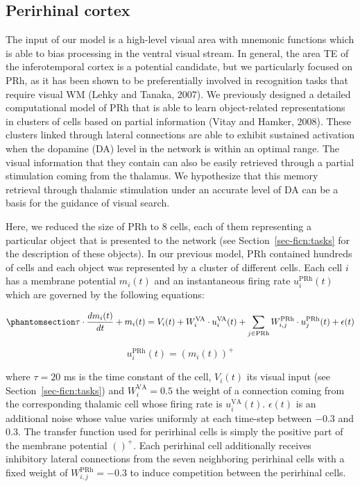 \documentclass[
  11pt,
  a4paper,
]{scrbook}
\begin{document}
\subsection{Perirhinal cortex}\label{perirhinal-cortex}

The input of our model is a high-level visual area with mnemonic
functions which is able to bias processing in the ventral visual stream.
In general, the area TE of the inferotemporal cortex is a potential
candidate, but we particularly focused on PRh, as it has been shown to
be preferentially involved in recognition tasks that require visual WM
(Lehky and Tanaka, 2007). We previously designed a detailed
computational model of PRh that is able to learn object-related
representations in clusters of cells based on partial information (Vitay
and Hamker, 2008). These clusters linked through lateral connections are
able to exhibit sustained activation when the dopamine (DA) level in the
network is within an optimal range. The visual information that they
contain can also be easily retrieved through a partial stimulation
coming from the thalamus. We hypothesize that this memory retrieval
through thalamic stimulation under an accurate level of DA can be a
basis for the guidance of visual search.

Here, we reduced the size of PRh to \(8\) cells, each of them
representing a particular object that is presented to the network (see
Section~\ref{sec-ficn:tasks} for the description of these objects). In
our previous model, PRh contained hundreds of cells and each object was
represented by a cluster of different cells. Each cell \(i\) has a
membrane potential \(m_i(t)\) and an instantaneous firing rate
\(u^{\text{PRh}}_i(t)\) which are governed by the following equations:

\begin{equation}\phantomsection\label{eq-ficn:mp-prh}{
    \tau \cdot \frac{d m_i(t)}{d t} + m_i(t)  =  V_i(t) + W^{\text{VA}}_{i} \cdot u^{\text{VA}}_i(t) + \displaystyle\sum_{j \in \text{PRh}} W^{\text{PRh}}_{i,j} \cdot u^{\text{PRh}}_j(t)  + \epsilon(t)
}\end{equation}

\[
    u^{\text{PRh}}_i(t)  =  (m_i(t))^+
\]

where \(\tau =20\) ms is the time constant of the cell, \(V_i(t)\) its
visual input (see Section~\ref{sec-ficn:tasks}) and
\(W^{\text{VA}}_{i} = 0.5\) the weight of a connection coming from the
corresponding thalamic cell whose firing rate is \(u^{\text{VA}}_i(t)\).
\(\epsilon(t)\) is an additional noise whose value varies uniformly at
each time-step between \(-0.3\) and \(0.3\). The transfer function used
for perirhinal cells is simply the positive part of the membrane
potential \(()^+\). Each perirhinal cell additionally receives
inhibitory lateral connections from the seven neighboring perirhinal
cells with a fixed weight of \(W^{\text{PRh}}_{i,j} = -0.3\) to induce
competition between the perirhinal cells.
\end{document}
